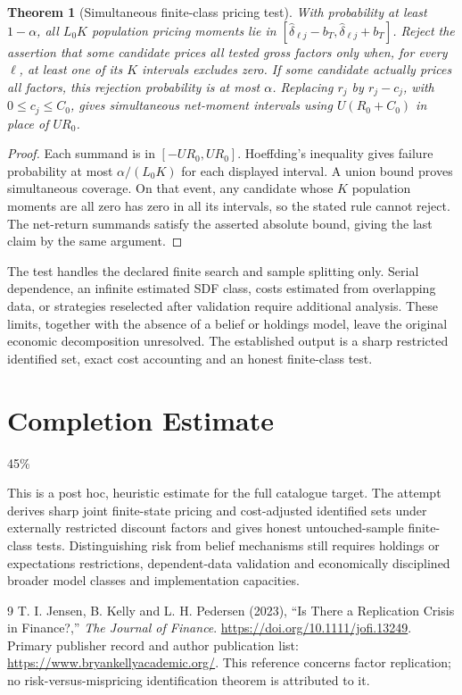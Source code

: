 \documentclass[11pt,a4paper]{article}
\newtheorem{theorem}{Theorem}[section]
\theoremstyle{definition}
\theoremstyle{remark}
\begin{document}
\begin{theorem}[Simultaneous finite-class pricing test]
With probability at least $1-\alpha$, all $L_0K$ population pricing moments lie in $[\widehat\delta_{\ell j}-b_T,\widehat\delta_{\ell j}+b_T]$. Reject the assertion that some candidate prices all tested gross factors only when, for every $\ell$, at least one of its $K$ intervals excludes zero. If some candidate actually prices all factors, this rejection probability is at most $\alpha$. Replacing $r_j$ by $r_j-c_j$, with $0\leq c_j\leq C_0$, gives simultaneous net-moment intervals using $U(R_0+C_0)$ in place of $UR_0$.
\end{theorem}
\begin{proof}
Each summand is in $[-UR_0,UR_0]$. Hoeffding's inequality gives failure probability at most $\alpha/(L_0K)$ for each displayed interval. A union bound proves simultaneous coverage. On that event, any candidate whose $K$ population moments are all zero has zero in all its intervals, so the stated rule cannot reject. The net-return summands satisfy the asserted absolute bound, giving the last claim by the same argument.
\end{proof}

The test handles the declared finite search and sample splitting only. Serial dependence, an infinite estimated SDF class, costs estimated from overlapping data, or strategies reselected after validation require additional analysis. These limits, together with the absence of a belief or holdings model, leave the original economic decomposition unresolved. The established output is a sharp restricted identified set, exact cost accounting and an honest finite-class test.

\section{Completion Estimate}
45\%

This is a post hoc, heuristic estimate for the full catalogue target.
The attempt derives sharp joint finite-state pricing and cost-adjusted identified sets under externally restricted discount factors and gives honest untouched-sample finite-class tests. Distinguishing risk from belief mechanisms still requires holdings or expectations restrictions, dependent-data validation and economically disciplined broader model classes and implementation capacities.

\begin{thebibliography}{9}
 T. I. Jensen, B. Kelly and L. H. Pedersen (2023), ``Is There a Replication Crisis in Finance?,'' \emph{The Journal of Finance}. \url{https://doi.org/10.1111/jofi.13249}. Primary publisher record and author publication list: \url{https://www.bryankellyacademic.org/}. This reference concerns factor replication; no risk-versus-mispricing identification theorem is attributed to it.
\end{thebibliography}
\end{document}
